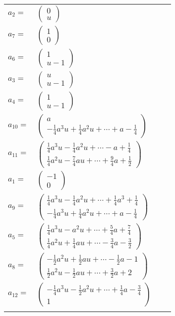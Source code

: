 \documentclass[1p]{elsarticle_modified}
\theoremstyle{definition}
\begin{document}
\begin{tabular}{m{7pt} m{180pt} m{7pt} m{180pt} }
\flushright $a_{2}=$&$\begin{pmatrix}0\\u\end{pmatrix}$ \\
\flushright $a_{7}=$&$\begin{pmatrix}1\\0\end{pmatrix}$ \\
\flushright $a_{6}=$&$\begin{pmatrix}1\\u-1\end{pmatrix}$ \\
\flushright $a_{3}=$&$\begin{pmatrix}u\\u-1\end{pmatrix}$ \\
\flushright $a_{4}=$&$\begin{pmatrix}1\\u-1\end{pmatrix}$ \\
\flushright $a_{10}=$&$\begin{pmatrix}a\\-\frac{1}{4} a^3 u+\frac{1}{4} a^2 u+\cdots+a-\frac{1}{4}\end{pmatrix}$ \\
\flushright $a_{11}=$&$\begin{pmatrix}\frac{1}{4} a^3 u-\frac{1}{4} a^2 u+\cdots- a+\frac{1}{4}\\\frac{1}{4} a^2 u-\frac{7}{4} a u+\cdots+\frac{9}{4} a+\frac{1}{2}\end{pmatrix}$ \\
\flushright $a_{1}=$&$\begin{pmatrix}-1\\0\end{pmatrix}$ \\
\flushright $a_{9}=$&$\begin{pmatrix}\frac{1}{4} a^3 u-\frac{1}{4} a^2 u+\cdots+\frac{1}{4} a^3+\frac{1}{4}\\-\frac{1}{4} a^3 u+\frac{1}{4} a^2 u+\cdots+a-\frac{1}{4}\end{pmatrix}$ \\
\flushright $a_{5}=$&$\begin{pmatrix}\frac{1}{4} a^3 u- a^2 u+\cdots+\frac{5}{4} a+\frac{7}{4}\\\frac{1}{4} a^2 u+\frac{1}{4} a u+\cdots-\frac{3}{4} a-\frac{3}{2}\end{pmatrix}$ \\
\flushright $a_{8}=$&$\begin{pmatrix}-\frac{1}{2} a^2 u+\frac{1}{2} a u+\cdots-\frac{1}{2} a-1\\\frac{1}{2} a^2 u-\frac{1}{2} a u+\cdots+\frac{3}{2} a+2\end{pmatrix}$ \\
\flushright $a_{12}=$&$\begin{pmatrix}-\frac{1}{4} a^3 u-\frac{1}{2} a^2 u+\cdots+\frac{1}{4} a-\frac{3}{4}\\1\end{pmatrix}$\\&\end{tabular}
\end{document}

